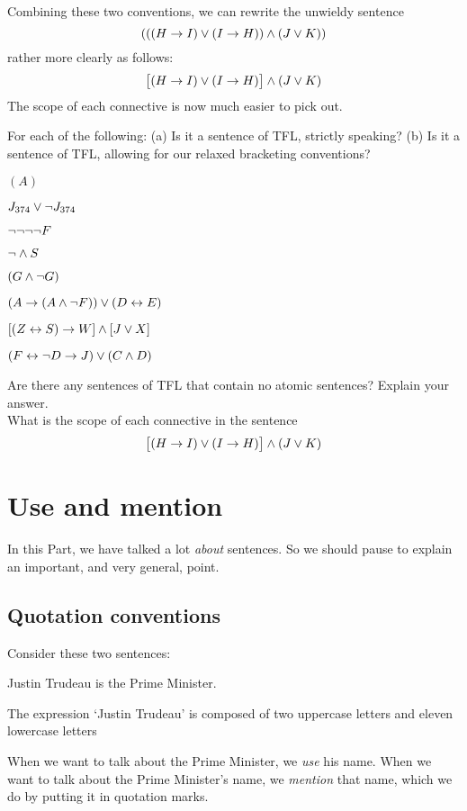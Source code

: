 Combining these two conventions, we can rewrite the unwieldy sentence
$$(((H \rightarrow I) \vee (I \rightarrow H)) \wedge (J \vee K))$$
rather more clearly as follows:
$$\bigl[(H \rightarrow I) \vee (I \rightarrow H)\bigr] \wedge (J \vee K)$$
The scope of each connective is now much easier to pick out.

\practiceproblems

\solutions
\problempart
\label{pr.wiffTFL}
For each of the following: (a) Is it a sentence of TFL, strictly speaking? (b) Is it a sentence of TFL, allowing for our relaxed bracketing conventions?
\begin{earg}
\item $(A)$
\item $J_{374} \vee \neg J_{374}$
\item $\neg \neg \neg \neg F$
\item $\neg \wedge S$
\item $(G \wedge \neg G)$
\item $(A \rightarrow (A \wedge \neg F)) \vee (D \leftrightarrow E)$
\item $[(Z \leftrightarrow S) \rightarrow W] \wedge [J \vee X]$
\item $(F \leftrightarrow \neg D \rightarrow J) \vee (C \wedge D)$
\end{earg}

\problempart
Are there any sentences of TFL that contain no atomic sentences? Explain your answer.\\

\problempart
What is the scope of each connective in the sentence
$$\bigl[(H \rightarrow I) \vee (I \rightarrow H)\bigr] \wedge (J \vee K)$$


\chapter{Use and mention}\label{s:UseMention}
In this Part, we have talked a lot \emph{about} sentences. So we should pause to explain an important, and very general, point.

\section{Quotation conventions}
Consider these two sentences:
	\begin{ebullet}
		\item Justin Trudeau is the Prime Minister.
		\item The expression `Justin Trudeau' is composed of two uppercase letters and eleven lowercase letters
	\end{ebullet}
When we want to talk about the Prime Minister, we \emph{use} his name. When we want to talk about the Prime Minister's name, we \emph{mention} that name, which we do by putting it in quotation marks.

